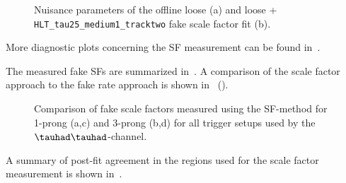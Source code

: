 \begin{figure}[htbp]
  \centering
  \caption{Nuisance parameters of the offline loose (a) and loose +
    \texttt{HLT\_tau25\_medium1\_tracktwo} fake \tauhad \ttbar scale
    factor fit (b).}
  \label{fig:ttbarfake_hadhad_nps}
\end{figure}

More diagnostic plots concerning the SF measurement can be found
in~.

The measured fake \tauhad SFs are summarized
in~. A comparison of the
scale factor approach to the fake rate approach is shown
in~
().

\begin{figure}[htbp]
  \centering


  \caption{Comparison of fake \tauhad scale factors measured using the
    SF-method for 1-prong \tauhad (a,c) and 3-prong \tauhad (b,d) for
    all trigger setups used by the $\tauhad\tauhad$-channel.}
  \label{fig:ttbarfake_hadhad_sf_scale_factors}
\end{figure}

A summary of post-fit agreement in the regions used for the scale
factor measurement is shown
in~. 

